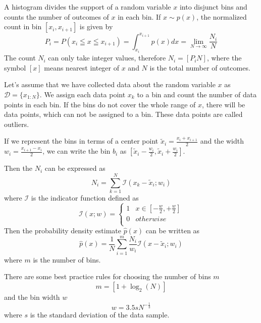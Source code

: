\documentclass{tstextbook}
\begin{document}
A histogram divides the support of a random variable $x$ into disjunct bins and counts the number of outcomes of $x$ in each bin. If $x\sim p(x)$, the normalized count in bin $[x_i,x_{i+1}]$ is given by
  \begin{equation}
    P_i=P\left(x_i\leqq x\leqq x_{i+1}\right)=\int_{x_i}^{x_{i+1}}p(x)dx=\lim_{N\rightarrow\infty}\frac{N_i}{N}
  \end{equation}
The count $N_i$ can only take integer values, therefore $N_i = [P_i N]$, where the symbol $[x]$ means nearest integer of $x$ and $N$ is the total number of outcomes.

Let's assume that we have collected data about the random variable $x$ as $\mathcal{D}=\{x_{1:N}\}$. We assign each data point $x_k$ to a bin and count the number of data points in each bin. If the bins do not cover the whole range of $x$, there will be data points, which can not be assigned to a bin. These data points are called outliers.  

If we represent the bins in terms of a center point $\tilde{x}_i=\frac{x_i + x_{i+1}}{2}$ and the width $w_i=\frac{x_{i+1}-x_i}{2}$, we can write the bin $b_i$ as $[\tilde{x}_i-\frac{w_i}{2},\tilde{x}_i+\frac{w_i}{2}]$.

Then the $N_i$ can be expressed as
  \begin{equation}
    N_i=\sum_{k=1}^{N}\mathcal{I}\left(x_k-\tilde{x}_i;w_i\right)
  \end{equation}
where $\mathcal{I}$ is the indicator function defined as
  \begin{equation}
    \mathcal{I}(x;w)=\begin{cases}1 & x\in [-\frac{w}{2},+\frac{w}{2}] \\
0 & otherwise \\
\end{cases}
  \end{equation}
Then the probability density estimate $\hat{p}(x)$ can be written as
  \begin{equation}
  \label{eq:probability_density_estimate}
    \hat{p}(x)=\frac{1}{N}\sum_{i=1}^{m}\frac{N_i}{w_i}\mathcal{I}\left(x-\tilde{x}_i;w_i\right)
  \end{equation}
  where $m$ is the number of bins.
  
There are some best practice rules for choosing the number of bins $m$ 
  \begin{equation}
        m = [1 + \log_{2}(N)]
  \end{equation}
and the bin width $w$
  \begin{equation}
        w = 3.5 s N^{-\frac{1}{3}}
  \end{equation}
where $s$ is the standard deviation of the data sample.\\
\end{document}
